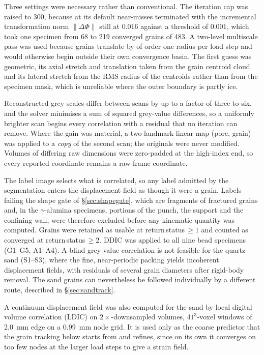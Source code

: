 \documentclass[preprint,12pt,numbers]{elsarticle}
\begin{document}
  Three settings were necessary rather than conventional.  The iteration cap
  was raised to 300, because at its default near-misses terminated with the
  incremental transformation norm $\|\Delta\Phi\|$ still at $0.016$ against a
  threshold of $0.001$, which took one specimen from 68 to 219 converged grains
  of 483.  A two-level multiscale pass was used because grains translate by of
  order one radius per load step and would otherwise begin outside their own
  convergence basin.  The first guess was geometric, its axial stretch and
  translation taken from the grain centroid cloud and its lateral stretch from
  the RMS radius of the centroids rather than from the specimen mask, which is
  unreliable where the outer boundary is partly ice.

  Reconstructed grey scales differ between scans by up to a factor of three to
  six, and the solver minimises a sum of squared grey-value differences, so a
  uniformly brighter scan begins every correlation with a residual that no
  iteration can remove.  Where the gain was material, a two-landmark linear map
  (pore, grain) was applied to a \emph{copy} of the second scan; the originals
  were never modified.  Volumes of differing raw dimensions were zero-padded at
  the high-index end, so every reported coordinate remains a raw-frame
  coordinate.

  The label image selects what is correlated, so any label admitted by the
  segmentation enters the displacement field as though it were a grain.  Labels
  failing the shape gate of \S\ref{sec:shapegate}, which are fragments of
  fractured grains and, in the $\gamma$-alumina specimens, portions of the
  punch, the support and the confining wall, were therefore excluded before any
  kinematic quantity was computed.  Grains were retained
  as usable at return\,status\,$\geq 1$ and counted as converged at
  return\,status\,$\geq 2$.  DDIC was applied to all nine bead specimens
  (G1--G5, A1--A4).  A blind grey-value correlation is not feasible for the
  quartz sand (S1--S3), where the fine, near-periodic packing yields incoherent
  displacement fields, with residuals of several grain diameters after
  rigid-body removal.  The sand grains can nevertheless be followed
  individually by a different route, described in \S\ref{sec:sandtrack}.

  A continuum displacement field was also computed for the sand by local
  digital volume correlation (LDIC) on $2\times$-downsampled volumes,
  $41^3$-voxel windows of \SI{2.0}{\milli\meter} edge on a
  \SI{0.99}{\milli\meter} node grid.  It is used only as the coarse predictor
  that the grain tracking below starts from and refines, since on its own it
  converges on too few nodes at the larger load steps to give a strain field.
\end{document}
